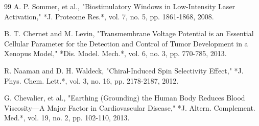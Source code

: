 \documentclass[10pt,twocolumn]{article}
\begin{document}
\begin{thebibliography}{99}
  A. P. Sommer, et al., "Biostimulatory Windows in Low-Intensity Laser Activation," *J. Proteome Res.*, vol. 7, no. 5, pp. 1861-1868, 2008.

  B. T. Chernet and M. Levin, "Transmembrane Voltage Potential is an Essential Cellular Parameter for the Detection and Control of Tumor Development in a Xenopus Model," *Dis. Model. Mech.*, vol. 6, no. 3, pp. 770-785, 2013.

  R. Naaman and D. H. Waldeck, "Chiral-Induced Spin Selectivity Effect," *J. Phys. Chem. Lett.*, vol. 3, no. 16, pp. 2178-2187, 2012.

  G. Chevalier, et al., "Earthing (Grounding) the Human Body Reduces Blood Viscosity—A Major Factor in Cardiovascular Disease," *J. Altern. Complement. Med.*, vol. 19, no. 2, pp. 102-110, 2013.
\end{thebibliography}
\end{document}
